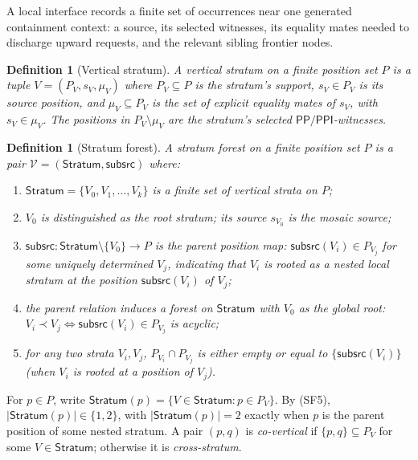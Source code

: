 \documentclass[11pt]{article}
\newtheorem{definition}[theorem]{Definition}
\newcommand{\PP}{\mathsf{PP}}
\newcommand{\PPI}{\mathsf{PPI}}
\newcommand{\Stratum}{\mathsf{Stratum}}
\newcommand{\Subsrc}{\mathsf{subsrc}}
\begin{document}
A local interface records a finite set of occurrences near one generated containment context: a source, its selected witnesses, its equality mates needed to discharge upward requests, and the relevant sibling frontier nodes.

\begin{definition}[Vertical stratum]\label{def:stratum}
A \emph{vertical stratum} on a finite position set $P$ is a tuple
$V=(P_V,s_V,\mu_V)$ where $P_V\subseteq P$ is the stratum's support,
$s_V\in P_V$ is its \emph{source position}, and
$\mu_V\subseteq P_V$ is the set of \emph{explicit equality mates of
$s_V$}, with $s_V\in\mu_V$.  The positions in $P_V\setminus\mu_V$
are the stratum's \emph{selected $\PP/\PPI$-witnesses}.
\end{definition}

\begin{definition}[Stratum forest]\label{def:stratum-forest}
A \emph{stratum forest} on a finite position set $P$ is a pair
$\mathcal V=(\Stratum,\Subsrc)$ where:
\begin{enumerate}[label=(SF\arabic*)]
\item $\Stratum=\{V_0,V_1,\dots,V_k\}$ is a finite set of vertical
  strata on $P$;
\item $V_0$ is distinguished as the \emph{root stratum}; its source
  $s_{V_0}$ is the \emph{mosaic source};
\item $\Subsrc:\Stratum\setminus\{V_0\}\to P$ is the \emph{parent
  position map}: $\Subsrc(V_i)\in P_{V_j}$ for some uniquely
  determined $V_j$, indicating that $V_i$ is rooted as a nested
  local stratum at the position $\Subsrc(V_i)$ of $V_j$;
\item the parent relation induces a forest on $\Stratum$ with $V_0$
  as the global root: $V_i\prec V_j\iff\Subsrc(V_i)\in P_{V_j}$ is
  acyclic;
\item for any two strata $V_i,V_j$, $P_{V_i}\cap P_{V_j}$ is either
  empty or equal to $\{\Subsrc(V_i)\}$ (when $V_i$ is rooted at a
  position of $V_j$).
\end{enumerate}
\end{definition}

\noindent
For $p\in P$, write $\Stratum(p)=\{V\in\Stratum:p\in P_V\}$.  By
(SF5), $|\Stratum(p)|\in\{1,2\}$, with $|\Stratum(p)|=2$ exactly
when $p$ is the parent position of some nested stratum.  A pair
$(p,q)$ is \emph{co-vertical} if $\{p,q\}\subseteq P_V$ for some
$V\in\Stratum$; otherwise it is \emph{cross-stratum}.
\end{document}
